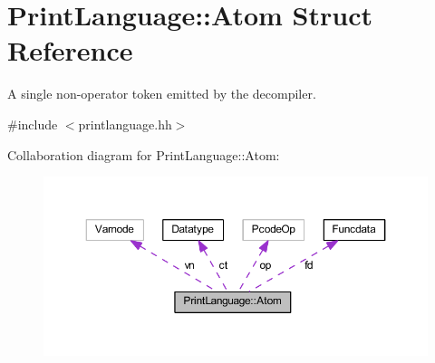 \hypertarget{struct_print_language_1_1_atom}{}\section{Print\+Language\+::Atom Struct Reference}
\label{struct_print_language_1_1_atom}


A single non-\/operator token emitted by the decompiler.  




{\ttfamily \#include $<$printlanguage.\+hh$>$}



Collaboration diagram for Print\+Language\+::Atom\+:
\nopagebreak
\begin{figure}[H]
\begin{center}
\leavevmode
\includegraphics[width=350pt]{struct_print_language_1_1_atom__coll__graph}
\end{center}
\end{figure}

